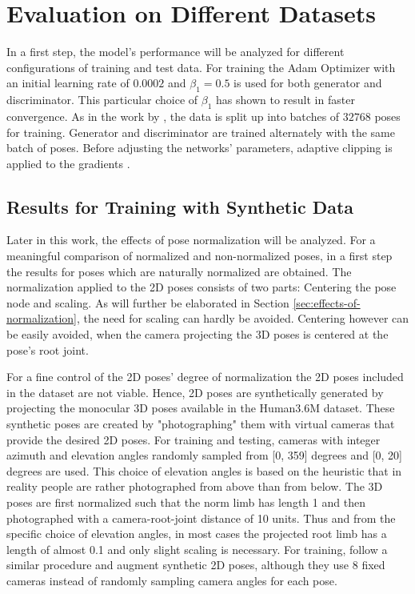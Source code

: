 \section{
	Evaluation on Different Datasets}
\label{sec:evaluation}

In a first step, the model's performance will be analyzed for different configurations of training and test data.
For training the Adam Optimizer \cite{kingma17} with an initial learning rate of $0.0002$ and $\beta_1 = 0.5$ is used for both generator and discriminator.
This particular choice of $\beta_1$ has shown to result in faster convergence.
As in the work by \citet{drover18}, the data is split up into batches of $32768$ poses for training.
Generator and discriminator are trained alternately with the same batch of poses.
Before adjusting the networks' parameters, adaptive clipping is applied to the gradients \cite[Section~3.2.1]{chorowski14}.


\subsection{Results for Training with Synthetic Data}

Later in this work, the effects of pose normalization will be analyzed.
For a meaningful comparison of normalized and non-normalized poses, in a first step the results for poses which are naturally normalized are obtained.
The normalization applied to the 2D poses consists of two parts: Centering the pose node and scaling.
As will further be elaborated in Section \ref{sec:effects-of-normalization}, the need for scaling can hardly be avoided.
Centering however can be easily avoided, when the camera projecting the 3D poses is centered at the pose's root joint.

For a fine control of the 2D poses' degree of normalization the 2D poses included in the dataset are not viable.
Hence, 2D poses are synthetically generated by projecting the monocular 3D poses available in the Human3.6M dataset.
These synthetic poses are created by "photographing" them with virtual cameras that provide the desired 2D poses.
For training and testing, cameras with integer azimuth and elevation angles randomly sampled from [0, 359] degrees and [0, 20] degrees are used.
This choice of elevation angles is based on the heuristic that in reality people are rather photographed from above than from below.
The 3D poses are first normalized such that the norm limb has length 1 and then photographed with a camera-root-joint distance of 10 units.
Thus and from the specific choice of elevation angles, in most cases the projected root limb has a length of almost 0.1 and only slight scaling is necessary.
For training, \citet{drover18} follow a similar procedure and augment synthetic 2D poses, although they use 8 fixed cameras instead of randomly sampling camera angles for each pose.

